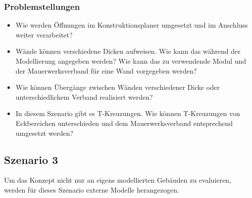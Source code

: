 \subsubsection*{Problemstellungen}
\begin{itemize}
  \item Wie werden Öffnungen im Konstruktionsplaner umgesetzt und im Anschluss weiter verarbeitet?
  \item Wände können verschiedene Dicken aufweisen. 
  Wie kann das während der Modellierung angegeben werden? 
  Wie kann das zu verwendende Modul und der Mauerwerksverband für eine Wand vorgegeben werden?
  \item Wie können Übergänge zwischen Wänden verschiedener Dicke oder unterschiedlichem Verband realisiert werden?
  \item In diesem Szenario gibt es T-Kreuzungen. 
  Wie können T-Kreuzungen von Eckbereichen unterschieden und dem Mauerwerksverband entsprechend umgesetzt werden? 
\end{itemize}

\subsection{Szenario 3}\label{scenarios:scenario3}
Um das Konzept nicht nur an eigens modellierten Gebäuden zu evaluieren, werden für dieses Szenario externe Modelle herangezogen.
